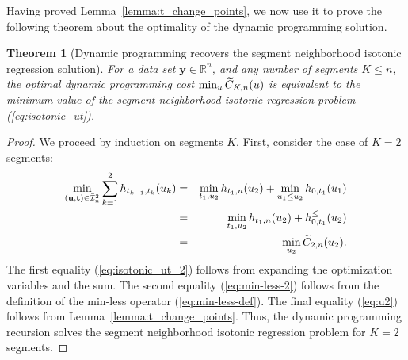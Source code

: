\documentclass{article}
\newtheorem{theorem}{Theorem}
\newcommand{\RR}{\mathbb R}
\begin{document}
Having proved Lemma~\ref{lemma:t_change_points}, we now use it to
prove the following theorem about the optimality of the dynamic
programming solution.
\begin{theorem}[Dynamic programming recovers the segment neighborhood isotonic regression solution]
  For a data set $\mathbf y\in\RR^n$, and any number of segments $K\leq n$,
  the optimal dynamic programming cost $\min_u \widetilde{C}_{K,n}(u)$ is
  equivalent to the minimum value of the segment neighborhood isotonic
  regression problem (\ref{eq:isotonic_ut}).
\end{theorem}
\begin{proof}
  We proceed by induction on segments $K$. First, consider the case of $K=2$ segments:
\begin{eqnarray}
  \label{eq:isotonic_ut_2}
  \min_{(\mathbf u, \mathbf t)\in\bar{\mathcal I}_n^2}
  \sum_{k=1}^2
  h_{t_{k-1}, t_k}(u_k)
  &= &
  \min_{t_1, u_2}
  h_{t_1,n}(u_2)
  +\min_{u_1\leq u_2}
  h_{0,t_1}(u_1)\\
  &=&
      \label{eq:min-less-2}
  \min_{t_1, u_2}
  h_{t_1,n}(u_2)
  +
  h^\leq_{0,t_1}(u_2)\\
  &=&
      \label{eq:u2}
  \min_{u_2} \widetilde{C}_{2, n}(u_2).
\end{eqnarray}
The first equality (\ref{eq:isotonic_ut_2}) follows from
expanding the optimization variables and the sum. The second equality
(\ref{eq:min-less-2}) follows from the definition of the min-less
operator (\ref{eq:min-less-def}). The final equality (\ref{eq:u2})
follows from Lemma~\ref{lemma:t_change_points}. Thus, the dynamic
programming recursion solves the segment neighborhood isotonic regression
problem for $K=2$ segments.


\end{proof}
\end{document}
